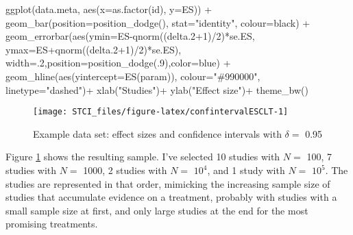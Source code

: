 \documentclass[
]{book}
\newenvironment{Shaded}{\begin{snugshade}}{\end{snugshade}}
\newcommand{\AttributeTok}[1]{\textcolor[rgb]{0.77,0.63,0.00}{#1}}
\newcommand{\DecValTok}[1]{\textcolor[rgb]{0.00,0.00,0.81}{#1}}
\newcommand{\FloatTok}[1]{\textcolor[rgb]{0.00,0.00,0.81}{#1}}
\newcommand{\FunctionTok}[1]{\textcolor[rgb]{0.00,0.00,0.00}{#1}}
\newcommand{\NormalTok}[1]{#1}
\newcommand{\SpecialCharTok}[1]{\textcolor[rgb]{0.00,0.00,0.00}{#1}}
\newcommand{\StringTok}[1]{\textcolor[rgb]{0.31,0.60,0.02}{#1}}
\theoremstyle{definition}
\theoremstyle{definition}
\theoremstyle{definition}
\theoremstyle{definition}
\theoremstyle{remark}
\begin{document}
\begin{Shaded}
\begin{Highlighting}[]
  \FunctionTok{ggplot}\NormalTok{(data.meta, }\FunctionTok{aes}\NormalTok{(}\AttributeTok{x=}\FunctionTok{as.factor}\NormalTok{(id), }\AttributeTok{y=}\NormalTok{ES)) }\SpecialCharTok{+}
      \FunctionTok{geom\_bar}\NormalTok{(}\AttributeTok{position=}\FunctionTok{position\_dodge}\NormalTok{(), }\AttributeTok{stat=}\StringTok{"identity"}\NormalTok{, }\AttributeTok{colour=}\StringTok{\textquotesingle{}black\textquotesingle{}}\NormalTok{) }\SpecialCharTok{+}
      \FunctionTok{geom\_errorbar}\NormalTok{(}\FunctionTok{aes}\NormalTok{(}\AttributeTok{ymin=}\NormalTok{ES}\SpecialCharTok{{-}}\FunctionTok{qnorm}\NormalTok{((delta}\FloatTok{.2}\SpecialCharTok{+}\DecValTok{1}\NormalTok{)}\SpecialCharTok{/}\DecValTok{2}\NormalTok{)}\SpecialCharTok{*}\NormalTok{se.ES, }\AttributeTok{ymax=}\NormalTok{ES}\SpecialCharTok{+}\FunctionTok{qnorm}\NormalTok{((delta}\FloatTok{.2}\SpecialCharTok{+}\DecValTok{1}\NormalTok{)}\SpecialCharTok{/}\DecValTok{2}\NormalTok{)}\SpecialCharTok{*}\NormalTok{se.ES), }\AttributeTok{width=}\NormalTok{.}\DecValTok{2}\NormalTok{,}\AttributeTok{position=}\FunctionTok{position\_dodge}\NormalTok{(.}\DecValTok{9}\NormalTok{),}\AttributeTok{color=}\StringTok{\textquotesingle{}blue\textquotesingle{}}\NormalTok{) }\SpecialCharTok{+}
      \FunctionTok{geom\_hline}\NormalTok{(}\FunctionTok{aes}\NormalTok{(}\AttributeTok{yintercept=}\FunctionTok{ES}\NormalTok{(param)), }\AttributeTok{colour=}\StringTok{"\#990000"}\NormalTok{, }\AttributeTok{linetype=}\StringTok{"dashed"}\NormalTok{)}\SpecialCharTok{+}
      \FunctionTok{xlab}\NormalTok{(}\StringTok{"Studies"}\NormalTok{)}\SpecialCharTok{+}
      \FunctionTok{ylab}\NormalTok{(}\StringTok{"Effect size"}\NormalTok{)}\SpecialCharTok{+}
      \FunctionTok{theme\_bw}\NormalTok{()}
\end{Highlighting}
\end{Shaded}

\begin{figure}[htbp]

{\centering \texttt{[image: STCI\_files/figure-latex/confintervalESCLT-1]} 

}

\caption{Example data set: effect sizes and confidence intervals with $\delta=$ 0.95}\label{fig:confintervalESCLT}
\end{figure}

Figure \ref{fig:confintervalESCLT} shows the resulting sample.
I've selected 10 studies with \(N=\) 100, 7 studies with \(N=\) 1000, 2 studies with \(N=\) \ensuremath{10^{4}}, and 1 study with \(N=\) \ensuremath{10^{5}}.
The studies are represented in that order, mimicking the increasing sample size of studies that accumulate evidence on a treatment, probably with studies with a small sample size at first, and only large studies at the end for the most promising treatments.
\end{document}
